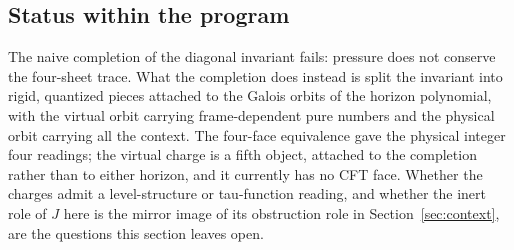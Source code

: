 \subsection{Status within the program}

The naive completion of the diagonal invariant fails: pressure does not conserve the four-sheet trace. What the completion does instead is split the invariant into rigid, quantized pieces attached to the Galois orbits of the horizon polynomial, with the virtual orbit carrying frame-dependent pure numbers and the physical orbit carrying all the context. The four-face equivalence gave the physical integer four readings; the virtual charge is a fifth object, attached to the completion rather than to either horizon, and it currently has no CFT face. Whether the charges admit a level-structure or tau-function reading, and whether the inert role of $J$ here is the mirror image of its obstruction role in Section~\ref{sec:context}, are the questions this section leaves open.


